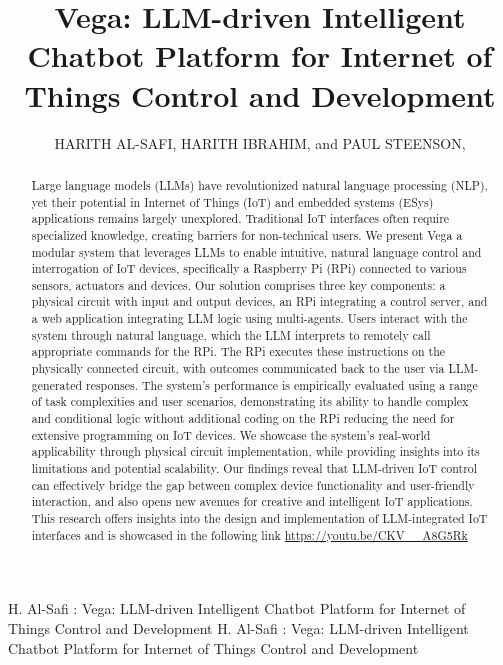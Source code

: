 \documentclass{ieeeaccess}
\begin{document}

\title{Vega: LLM-driven Intelligent Chatbot Platform for Internet of Things Control and Development}
\author{\uppercase{Harith Al-Safi},
    \uppercase{Harith Ibrahim}, and {\uppercase{Paul Steenson},
    }}

\address{School of Electronics and Electrical Engineering, University of Leeds,
    Leeds LS2 9JT, U.K}

\markboth
{H. Al-Safi \headeretal: Vega: LLM-driven Intelligent Chatbot Platform for Internet of Things Control and Development}
{H. Al-Safi \headeretal: Vega: LLM-driven Intelligent Chatbot Platform for Internet of Things Control and Development}


\begin{abstract}
    Large language models (LLMs) have revolutionized natural language processing (NLP), yet their potential in Internet of Things (IoT) and embedded systems (ESys) applications remains largely unexplored. Traditional IoT interfaces often require specialized knowledge, creating barriers for non-technical users. We present Vega a modular system that leverages LLMs to enable intuitive, natural language control and interrogation of IoT devices, specifically a Raspberry Pi (RPi) connected to various sensors, actuators and devices. Our solution comprises three key components: a physical circuit with input and output devices, an RPi integrating a control server, and a web application integrating LLM logic using multi-agents. Users interact with the system through natural language, which the LLM interprets to remotely call appropriate commands for the RPi. The RPi executes these instructions on the physically connected circuit, with outcomes communicated back to the user via LLM-generated responses. The system's performance is empirically evaluated using a range of task complexities and user scenarios, demonstrating its ability to handle complex and conditional logic without additional coding on the RPi reducing the need for extensive programming on IoT devices. We showcase the system's real-world applicability through physical circuit implementation, while providing insights into its limitations and potential scalability. Our findings reveal that LLM-driven IoT control can effectively bridge the gap between complex device functionality and user-friendly interaction, and also opens new avenues for creative and intelligent IoT applications. This research offers insights into the design and implementation of LLM-integrated IoT interfaces and is showcased in the following link \url{https://youtu.be/CKV\_\_A8G5Rk}
\end{abstract}
\end{document}
